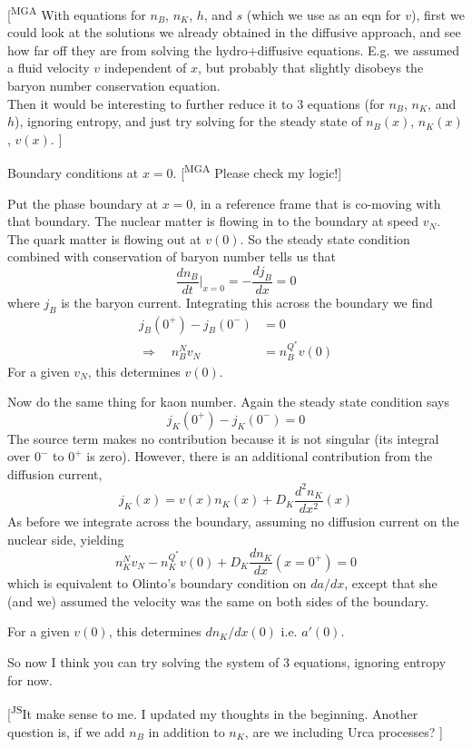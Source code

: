 \documentclass[11pt]{article}
\newcommand{\mga}[1]{{\color[rgb]{0.8,0,0}#1}}
\newcommand{\mgacom}[1]{\textsf{\color[rgb]{0.6,0,0}[\textsuperscript{MGA} #1]}}
\newcommand{\JScom}[1]{\textsf{\color{violet} [\textsuperscript{JS}#1]}}
\begin{document}
\mgacom{
With equations for $n_B$, $n_K$, $h$, and $s$ (which we use as an eqn for $v$), first we could look at the solutions we already obtained in the diffusive approach, and see how far off they are from solving the hydro+diffusive equations. E.g. we assumed a fluid velocity $v$ independent of $x$, but probably that slightly disobeys the baryon number conservation equation.\\
Then it would be interesting to further reduce it to 3 equations (for $n_B$, $n_K$, and $h$), ignoring entropy, and just try solving for the steady state of $n_B(x)$, $n_K(x)$, $v(x)$.
}

\mga{
Boundary conditions at $x=0$. \mgacom{Please check my logic!}

Put the phase boundary at $x=0$, in a reference frame that is co-moving with that boundary.  The nuclear matter is flowing in to the boundary at speed $v_N$. The quark matter is flowing out at $v(0)$. So the steady state condition combined with conservation of baryon number tells us that
\[
\dfrac{dn_B}{dt}\Bigr|_{x=0} = -\dfrac{d j_B}{dx} = 0
\]
where $j_B$ is the baryon current.
Integrating this across the boundary we find
\begin{align*}
j_B(0^+) - j_B(0^-) &= 0 \\[2ex]
\Rightarrow\quad
n_B^N v_N &= n_B^{Q^*} v(0)
\end{align*}
For a given $v_N$, this determines $v(0)$.

Now do the same thing for kaon number. Again  the steady state condition says
\[ j_K(0^+) - j_K(0^-) = 0 \]
The source term makes no contribution because it is not singular (its integral over $0^-$ to $0^+$ is zero). However, there is an additional contribution from the diffusion current,
\[
j_K(x) = v(x) n_K(x) + D_K \dfrac{d^2 n_K}{dx^2}(x)
\]
As before we integrate across the boundary, assuming no diffusion current on the nuclear side, yielding
\[
n_K^N v_N - n_K^{Q^*} v(0) + D_K \dfrac{dn_K}{dx}
(x{=}0^+) = 0
\]
which is equivalent to Olinto's boundary condition on $da/dx$, except that she (and we) assumed the velocity was the same on both sides of the boundary.

For a given $v(0)$, this determines $dn_K/dx(0)$
i.e. $a'(0)$.

So now I think you can try solving the system of 3 equations, ignoring entropy for now. 
}

\JScom{It make sense to me. I updated my thoughts in the beginning. 
Another question is, if we add $n_B$ in addition to $n_K$, are we including Urca processes? }
\end{document}
